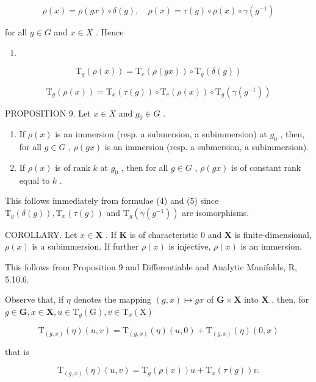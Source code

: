 \[
\rho (x) = \rho (g x) \circ \delta (g), \quad \rho (x) = \tau (g) \circ \rho (x) \circ \gamma (g ^ {- 1})\tag{3}
\]

for all \(g\in G\) and \(x\in X\) . Hence

\begin{enumerate}
\def\labelenumi{(\arabic{enumi})}
\setcounter{enumi}{3}
\tightlist
\item
\end{enumerate}

\[
\mathrm{T} _ {g} (\rho (x)) = \mathrm{T} _ {e} (\rho (g x)) \circ \mathrm{T} _ {g} (\delta (g))
\]

\[
\mathrm{T} _ {g} (\rho (x)) = \mathrm{T} _ {x} (\tau (g)) \circ \mathrm{T} _ {e} (\rho (x)) \circ \mathrm{T} _ {g} (\gamma (g ^ {- 1}))\tag{5}
\]

PROPOSITION 9. Let \(x \in X\) and \(g_0 \in G\) .

\begin{enumerate}
\def\labelenumi{(\roman{enumi})}
\item
  If \(\rho(x)\) is an immersion (resp. a submersion, a subimmersion) at \(g_0\) , then, for all \(g \in G\) , \(\rho(gx)\) is an immersion (resp. a submersion, a subimmersion).
\item
  If \(\rho(x)\) is of rank \(k\) at \(g_0\) , then for all \(g \in G\) , \(\rho(gx)\) is of constant rank equal to \(k\) .
\end{enumerate}

This follows immediately from formulae (4) and (5) since \(\mathrm{T}_{g}(\delta(g)),\mathrm{T}_{x}(\tau(g))\) and \(\mathrm{T}_{g}(\gamma(g^{-1}))\) are isomorphisms.

COROLLARY. Let \(x \in \mathbf{X}\) . If \(\mathbf{K}\) is of characteristic 0 and \(\mathbf{X}\) is finite-dimensional, \(\rho(x)\) is a subimmersion. If further \(\rho(x)\) is injective, \(\rho(x)\) is an immersion.

This follows from Proposition 9 and Differentiable and Analytic Manifolds, R, 5.10.6.

Observe that, if \(\eta\) denotes the mapping \((g,x)\mapsto gx\) of \(\mathbf{G}\times \mathbf{X}\) into \(\mathbf{X}\) , then, for \(g\in \mathbf{G},x\in \mathbf{X},u\in \mathrm{T}_g(\mathrm{G}),v\in \mathrm{T}_x(\mathrm{X})\)

\[
\mathrm{T} _ {(g, x)} (\eta) (u, v) = \mathrm{T} _ {(g, x)} (\eta) (u, 0) + \mathrm{T} _ {(g, x)} (\eta) (0, x)
\]

that is

\[
\mathrm{T} _ {(g, x)} (\eta) (u, v) = \mathrm{T} _ {g} (\rho (x)) u + \mathrm{T} _ {x} (\tau (g)) v.\tag{6}
\]

